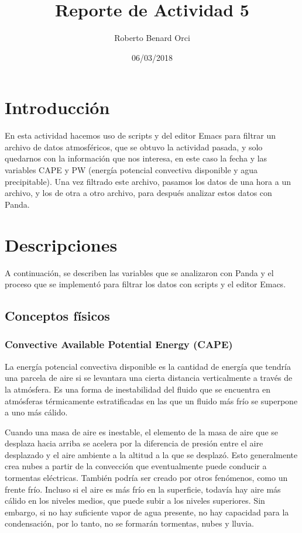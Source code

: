 \documentclass{article}
\title{Reporte de Actividad 5}
\author{Roberto Benard Orci}
\date{06/03/2018}
\begin{document}
\maketitle

\section{Introducción}
En esta actividad hacemos uso de scripts y del editor Emacs para filtrar un archivo de datos atmosféricos, que se obtuvo la actividad pasada, y solo quedarnos con la información que nos interesa, en este caso la fecha y las variables CAPE y PW (energía potencial convectiva disponible y agua precipitable). Una vez filtrado este archivo, pasamos los datos de una hora a un archivo, y los de otra a otro archivo, para después analizar estos datos con Panda.

\section{Descripciones}

A continuación, se describen las variables que se analizaron con Panda y el proceso que se implementó para filtrar los datos con scripts y el editor Emacs.

\subsection{Conceptos físicos}

\vspace{0.3cm}

\subsubsection{Convective Available Potential Energy (CAPE)}

La energía potencial convectiva disponible es la cantidad de energía que tendría una parcela de aire si se levantara una cierta distancia verticalmente a través de la atmósfera. Es una forma de inestabilidad del fluido que se encuentra en atmósferas térmicamente estratificadas en las que un fluido más frío se superpone a uno más cálido.

Cuando una masa de aire es inestable, el elemento de la masa de aire que se desplaza hacia arriba se acelera por la diferencia de presión entre el aire desplazado y el aire ambiente a la altitud a la que se desplazó. Esto generalmente crea nubes a partir de la convección que eventualmente puede conducir a tormentas eléctricas. También podría ser creado por otros fenómenos, como un frente frío. Incluso si el aire es más frío en la superficie, todavía hay aire más cálido en los niveles medios, que puede subir a los niveles superiores. Sin embargo, si no hay suficiente vapor de agua presente, no hay capacidad para la condensación, por lo tanto, no se formarán tormentas, nubes y lluvia.
\end{document}
